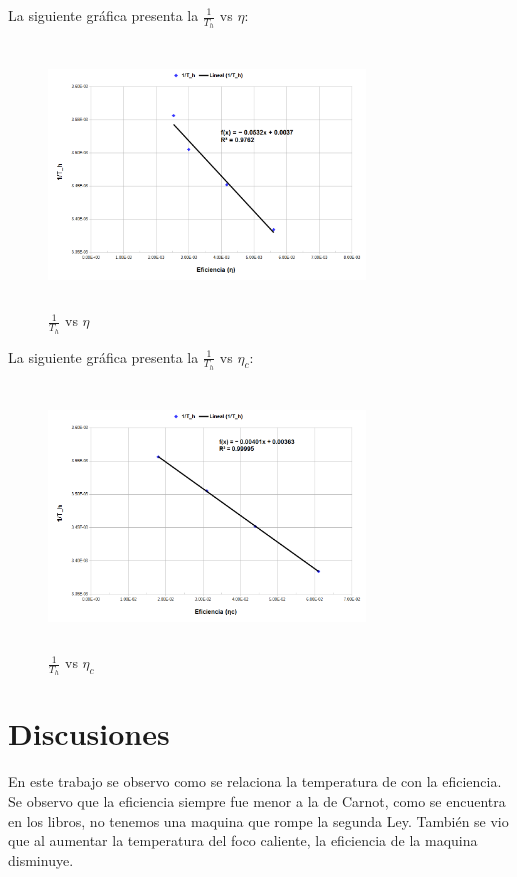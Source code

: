 \documentclass[12pt]{article}
\begin{document}
La siguiente gráfica presenta la $\frac{1}{T_h}$ vs $\eta$:

	\begin{figure}[H]
		\centering
		\includegraphics[width=0.75\textwidth , height = 7cm]{1-TvsN.png}  
		\caption{$\frac{1}{T_h}$ vs $\eta$}
		\label{n}
	\end{figure}

La siguiente gráfica presenta la $\frac{1}{T_h}$ vs $\eta_c$:

	\begin{figure}[H]
		\centering
		\includegraphics[width=0.75\textwidth , height = 7cm]{1-TvsNc.png}  
		\caption{$\frac{1}{T_h}$ vs $\eta_c$}
		\label{nc}
	\end{figure}
\section{Discusiones}
En este trabajo se observo como se relaciona la temperatura de con la eficiencia. Se observo que la eficiencia siempre fue menor a la de Carnot, como se encuentra en los libros, no tenemos una maquina que rompe la segunda Ley. También se vio que al aumentar la temperatura del foco caliente, la eficiencia de la maquina disminuye.
\end{document}
